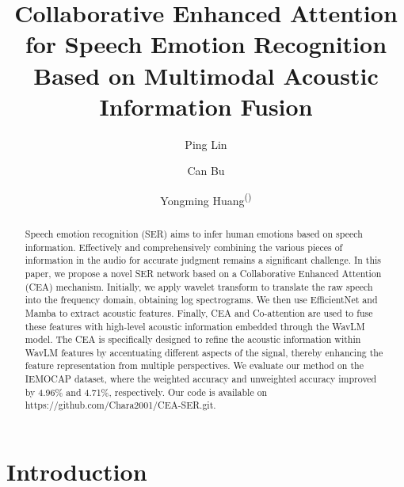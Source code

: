\documentclass[runningheads]{llncs}
\begin{document}
%
\title{Collaborative Enhanced Attention for Speech Emotion Recognition Based on Multimodal Acoustic Information Fusion}
%
%
\author{Ping Lin \and
Can Bu \and
Yongming Huang\textsuperscript{(\Letter)}}
%
%
%
\maketitle              %
%
\begin{abstract}
Speech emotion recognition (SER) aims to infer human emotions based on speech information. Effectively and comprehensively combining the various pieces of information in the audio for accurate judgment remains a significant challenge. In this paper, we propose a novel SER network based on a Collaborative Enhanced Attention (CEA) mechanism. Initially, we apply wavelet transform to translate the raw speech into the frequency domain, obtaining log spectrograms. We then use EfficientNet and Mamba to extract acoustic features. Finally, CEA and Co-attention are used to fuse these features with high-level acoustic information embedded through the WavLM model. The CEA is specifically designed to refine the acoustic information within WavLM features by accentuating different aspects of the signal, thereby enhancing the feature representation from multiple perspectives. We evaluate our method on the IEMOCAP dataset, where the weighted accuracy and unweighted accuracy improved by 4.96\% and 4.71\%, respectively. Our code is available on https://github.com/Chara2001/CEA-SER.git.

\end{abstract}
%
%
%
\section{Introduction}
\label{sec:intro}
\end{document}

